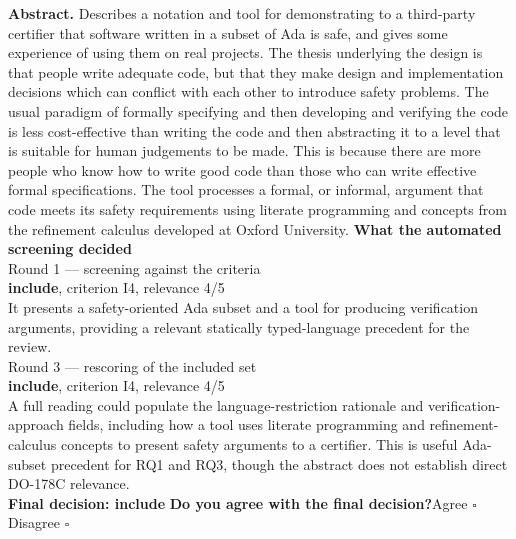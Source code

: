 \documentclass[11pt,a4paper]{article}
\begin{document}
{\small\textbf{Abstract.} Describes a notation and tool for demonstrating to a third-party certifier that software written in a subset of Ada is safe, and gives some experience of using them on real projects. The thesis underlying the design is that people write adequate code, but that they make design and implementation decisions which can conflict with each other to introduce safety problems. The usual paradigm of formally specifying and then developing and verifying the code is less cost-effective than writing the code and then abstracting it to a level that is suitable for human judgements to be made. This is because there are more people who know how to write good code than those who can write effective formal specifications. The tool processes a formal, or informal, argument that code meets its safety requirements using literate programming and concepts from the refinement calculus developed at Oxford University.}
\vspace{3mm}
\vspace{2.5mm}
{\small\textbf{What the automated screening decided}}\\[2mm]
{\footnotesize\color{soft}Round 1 --- screening against the criteria}\\[0.5mm]
{\small\textbf{include}, criterion I4, relevance 4/5}\\[0.5mm]
{\small It presents a safety-oriented Ada subset and a tool for producing verification arguments, providing a relevant statically typed-language precedent for the review.}\\[2.5mm]
{\footnotesize\color{soft}Round 3 --- rescoring of the included set}\\[0.5mm]
{\small\textbf{include}, criterion I4, relevance 4/5}\\[0.5mm]
{\small A full reading could populate the language-restriction rationale and verification-approach fields, including how a tool uses literate programming and refinement-calculus concepts to present safety arguments to a certifier. This is useful Ada-subset precedent for RQ1 and RQ3, though the abstract does not establish direct DO-178C relevance.}\\[2.5mm]
{\small\textbf{Final decision: include}}
\vspace{2mm}
{\small\textbf{Do you agree with the final decision?}\quad{}Agree $\square$\qquad{}Disagree $\square$}\\[1mm]
\end{document}

